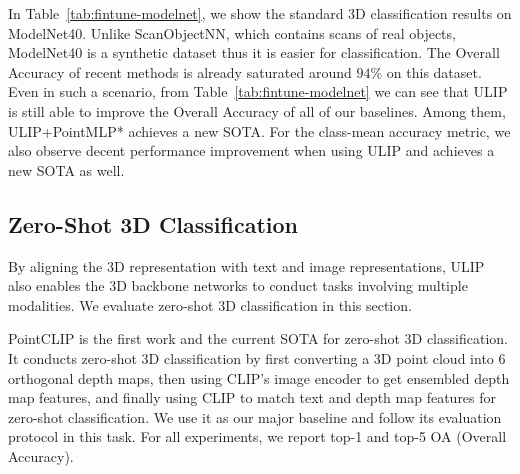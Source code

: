\documentclass[10pt,twocolumn,letterpaper]{article}
\begin{document}
In Table~\ref{tab:fintune-modelnet}, we show the standard 3D classification results on ModelNet40.
Unlike ScanObjectNN, which contains scans of real objects, ModelNet40 is a synthetic dataset thus it is easier for classification. The Overall Accuracy of recent methods is already saturated around $94\%$ on this dataset.
Even in such a scenario, from Table~\ref{tab:fintune-modelnet} we can see that ULIP is still able to improve the Overall Accuracy of all of our baselines. Among them, ULIP+PointMLP* achieves a new SOTA.
For the class-mean accuracy metric, we also observe decent performance improvement when using ULIP and achieves a new SOTA as well.


\subsection{Zero-Shot 3D Classification}
By aligning the 3D representation with text and image representations, ULIP also enables the 3D backbone networks to conduct tasks involving multiple modalities. We evaluate zero-shot 3D classification in this section.

PointCLIP is the first work and the current SOTA for zero-shot 3D classification. It conducts zero-shot 3D classification by first converting a 3D point cloud into 6 orthogonal depth maps, then using CLIP's image encoder to get ensembled depth map features, and finally using CLIP to match text and depth map features for zero-shot classification. We use it as our major baseline and follow its evaluation protocol in this task. For all experiments, we report top-1 and top-5 OA (Overall Accuracy).
\end{document}
